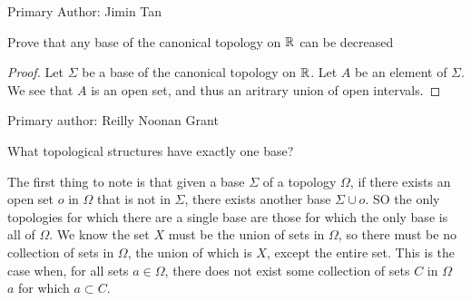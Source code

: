 Primary Author: Jimin Tan

\begin{minorEx}[Riddle]%
  Prove that any base of the canonical topology on $\mathbb{R}$ can be decreased
\end{minorEx}
\begin{proof}
  Let $\Sigma$ be a base of the canonical topology on $\mathbb{R}$. Let $A$ be an element of 
  $\Sigma$. We see that $A$ is an open set, and thus an aritrary union of open intervals. 
\end{proof}

Primary author: Reilly Noonan Grant

\begin{minorEx}[Riddle]%
What topological structures have exactly one base?
\end{minorEx}
The first thing to note is that given a base $\Sigma$ of a topology $\Omega$, if there exists an open set $o$ in $\Omega$ that is not in $\Sigma$, there exists another base $\Sigma \cup o$. SO the only topologies for which there are a single base are those for which the only base is all of $\Omega$. We know the set $X$ must be the union of sets in $\Omega$, so there must be no collection of sets in $\Omega$, the union of which is $X$, except the entire set. This is the case when, for all sets $a \in \Omega$, there does not exist some collection of sets $C$ in $\Omega$ \ $a$ for which $a \subset C$.
